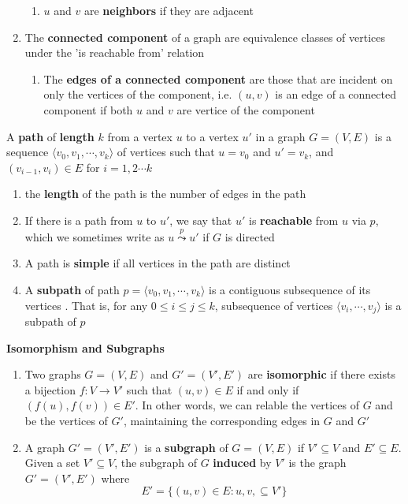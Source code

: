 \documentclass[11pt]{article}
\begin{document}
\begin{defn*}
\begin{enumerate}
\begin{enumerate}
            \item $u$ and $v$ are \textbf{neighbors} if they are adjacent
        \end{enumerate}
        \item The \textbf{connected component} of a graph are equivalence classes of vertices under the 'is reachable from' relation
        \begin{enumerate}
            \item The \textbf{edges of a connected component} are those that are incident on only the vertices of the component, i.e. $(u,v)$ is an edge of a connected component if both $u$ and $v$ are vertice of the component 
        \end{enumerate}
    \end{enumerate}
\end{defn*}

\begin{defn*}
A \textbf{path} of \textbf{length} $k$ from a vertex $u$ to a vertex $u'$ in a graph $G = (V, E)$ is a sequence $\langle v_0, v_1, \cdots, v_k \rangle$ of vertices such that $u = v_0$ and $u' = v_k$, and $(v_{i-1}, v_i) \in E$ for $i = 1, 2\cdots k$
\begin{enumerate}
    \item the \textbf{length} of the path is the number of edges in the path 
    \item If there is a path from $u$ to $u'$, we say that $u'$ is \textbf{reachable} from $u$ via $p$, which we sometimes write as $u \overset{p}{\leadsto} u'$ if $G$ is directed 
    \item A path is \textbf{simple} if all vertices in the path are distinct 
    \item A \textbf{subpath} of path $p=\langle v_0, v_1, \cdots, v_k \rangle$ is a contiguous subsequence of its vertices . That is, for any $0 \leq i \leq j\leq k$, subsequence of vertices $\langle v_i, \cdots, v_j \rangle$ is a subpath of $p$
\end{enumerate}
\end{defn*}



\begin{defn*}
    \textbf{Isomorphism and Subgraphs}
    \begin{enumerate}
        \item Two graphs $G = (V, E)$ and $G' = (V', E')$ are \textbf{isomorphic} if there exists a bijection $f: V \to V'$ such that $(u,v) \in E$ if and only if $(f(u), f(v))\in E'$. In other words, we can relable the vertices of $G$ and be the vertices of $G'$, maintaining the corresponding edges in $G$ and $G'$
        \item A graph $G' = (V', E')$ is a \textbf{subgraph} of $G = (V, E)$ if $V' \subseteq V$ and $E' \subseteq E$. Given a set $V' \subseteq V$, the subgraph of $G$ \textbf{induced} by $V'$ is the graph $G'= (V', E')$ where 
        \[
            E' = \{ (u,v) \in E: u,v, \subseteq V'\}
        \]
    \end{enumerate}
\end{defn*}
\end{document}
